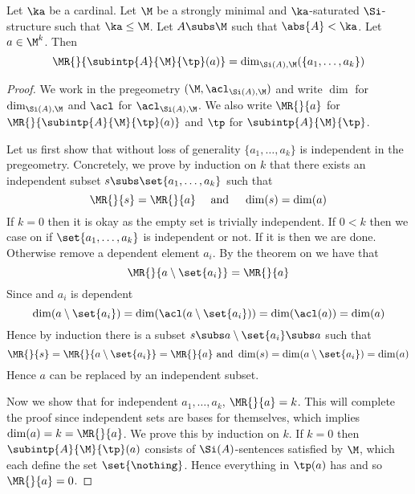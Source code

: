 \begin{prop}
    Let $\ka$ be a cardinal.
    Let $\M$ be a strongly minimal and $\ka$-saturated $\Si$-structure
    such that $\ka \leq \M$.
    Let $A \subs \M$ such that $\abs{A} < \ka$.
    Let $a \in \M^k$. Then 
    \[\MR{}{\subintp{A}{\M}{\tp}(a)} = \dim_{\Si(A),\M}(\{a_1,\dots,a_k\})\]
\end{prop}
\begin{proof}
    We work in the pregeometry $(\M,\acl_{\Si(A),\M})$ and write 
    $\dim$ for $\dim_{\Si(A),\M}$ and $\acl$ for $\acl_{\Si(A),\M}$.
    We also write $\MR{}{a}$ for $\MR{}{\subintp{A}{\M}{\tp}(a)}$ and
    $\tp$ for $\subintp{A}{\M}{\tp}$.

    Let us first show that without loss of generality 
    $\{a_1,\dots,a_k\}$ is independent in the pregeometry.
    Concretely, we prove by induction on $k$ that there exists an independent
    subset $s \subs \set{a_1,\dots,a_k}$ such that 
    \[\MR{}{s} = \MR{}{a} \quad \text{ and } \quad \dim(s) = \dim(a)\]
    If $k = 0$ then it is okay as the empty set is trivially independent.
    If $0 < k$ then we case on if $\set{a_1,\dots,a_k}$ is independent
    or not.
    If it is then we are done. 
    Otherwise remove a dependent element $a_i$.
    By the theorem on  we have that 
    \[\MR{}{a \setminus \set{a_i}} = \MR{}{a}\]
    Since 
    and $a_i$ is dependent
    \[
        \dim(a \setminus \set{a_i}) = \dim(\acl(a \setminus \set{a_i}))
        = \dim(\acl(a)) = \dim(a)
    \]
    Hence by induction there is a subset $s \subs a \setminus \set{a_i} \subs a$
    such that 
    \[\MR{}{s} = \MR{}{a \setminus \set{a_i}} = \MR{}{a}
    \text{ and } \dim(s) = \dim(a \setminus \set{a_i}) = \dim(a)\]
    Hence $a$ can be replaced by an independent subset.

    Now we show that for independent $a_1,\dots,a_k$, $\MR{}{a} = k$.
    This will complete the proof since independent sets 
    are bases for themselves, which implies $\dim(a) = k = \MR{}{a}$.
    We prove this by induction on $k$.
    If $k = 0$ then $\subintp{A}{\M}{\tp}(a)$ 
    consists of $\Si(A)$-sentences satisfied by $\M$, 
    which  each define the set 
    $\set{\nothing}$. 
    Hence everything in $\tp(a)$ has 
    and so $\MR{}{a} = 0$.


\end{proof}
